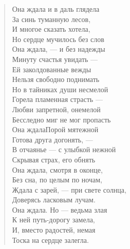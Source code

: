 \begin{verse}
\begin{altverse}
Она ждала и в даль глядела\\
    За синь туманную лесов,\\
И многое сказать хотела,\\
    Но сердце мучилось без слов\ldotst\\
Она ждала, --- и без надежды\\
    Минуту счастья увидать ---\\
Ей заколдованные вежды\\
    Нельзя свободно поднимать\ldotst\\
Но в тайниках души несмелой\\
    Горела пламенная страсть ---\\
Любви запретной, онемелой\\
    Бесследно миг не мог пропасть\ldotst\\
Она ждала\ldotst Порой мятежной\\
    Готова друга догонять, ---\\
В отчаянье --- с улыбкой нежной\\
    Скрывая страх, его обнять\ldotst\\
Она ждала, смотря в оконце,\\
    Без сна, по целым по ночам,\\
Ждала с зарей, --- при свете солнца,\\
    Доверясь ласковым лучам.\\
Она ждала. Но --- ведьма злая\\
    К ней путь-дорогу замела,\\
И, вместо радостей, немая\\
    Тоска на сердце залегла.
\end{altverse}
\end{verse}

\newpage
\vspace*{0cm}


